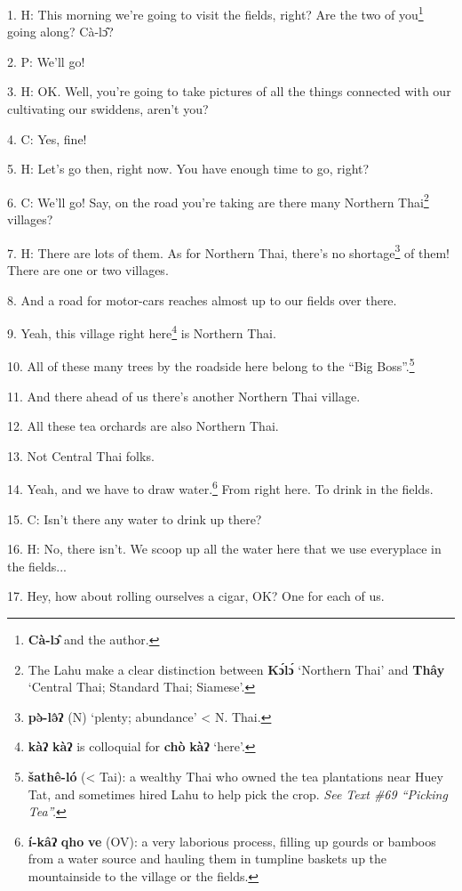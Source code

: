 \setcounter{footnote}{0}

1. H:  This morning we're going to visit
the fields, right? Are the two of you\footnote{\textbf{Cà-lɔ̂} and the author.} going along? Cà-lɔ̂?

2. P: We'll go!

3. H: OK. Well, you're going to take pictures of all the things connected with
our cultivating our swiddens, aren't you?

4. C: Yes, fine!

5. H: Let's go then, right now. You have enough time to go, right?

6. C: We'll go! Say, on the road you're taking are there many Northern Thai\footnote{The Lahu make a clear distinction between \textbf{Kɔ́lɔ́} `Northern Thai' and \textbf{Thây} `Central Thai; Standard Thai; Siamese'.}
villages?

7. H: There are lots of them. As for Northern Thai, there's no shortage\footnote{\textbf{pə̀-lə̂ʔ} (N) `plenty; abundance' < N. Thai.} of
them! There are one or two villages.

8. And a road for motor-cars reaches almost up to our fields over there.

9. Yeah, this village right here\footnote{\textbf{kàʔ} \textbf{kàʔ} is colloquial for \textbf{chò} \textbf{kàʔ} `here'.} is Northern Thai.

10. All of these many trees by the roadside here belong to the ``Big Boss''.\footnote{\textbf{šathê-ló} (< Tai): a wealthy Thai who owned the tea plantations near Huey Tat, and sometimes hired Lahu to help pick the crop. \textit{See Text \#69 ``Picking Tea''.}}

11. And there ahead of us there's another Northern Thai village.

12. All these tea orchards are also Northern Thai.

13. Not Central Thai folks.

14. Yeah, and we have to draw water.\footnote{\textbf{í-kâʔ} \textbf{qho} \textbf{ve} (OV): a very laborious process, filling up gourds or bamboos from a water source and hauling them in tumpline baskets up the mountainside to the village or the fields.} From right here. To drink in the fields.

15. C: Isn't there any water to drink up there?

16. H: No, there isn't. We scoop up all the water here that we use everyplace in
the fields...

17. Hey, how about rolling ourselves a cigar, OK? One for each of us.

